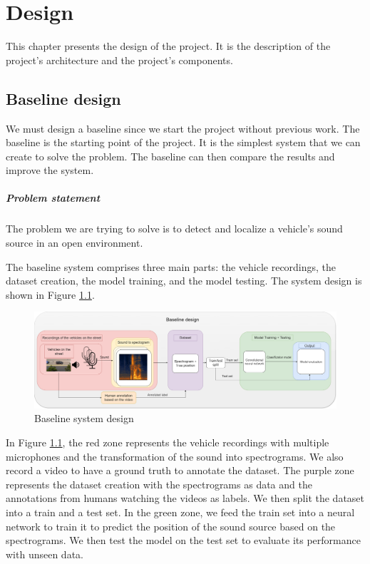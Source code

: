 
\chapter{Design}
\label{ch:methodology}

This chapter presents the design of the project. It is the description of the project's architecture and the project's components.

\section{Baseline design}
\label{sec:baseline_design}

We must design a baseline since we start the project without previous work. The baseline is the starting point of the project. It is the simplest system that we can create to solve the problem. The baseline can then compare the results and improve the system.

\paragraph{Problem statement}

The problem we are trying to solve is to detect and localize a vehicle's sound source in an open environment. 

The baseline system comprises three main parts: the vehicle recordings, the dataset creation, the model training, and the model testing. The system design is shown in Figure \ref{fig:baseline_system_design}.

\begin{figure}[H]
    \centering
    \includegraphics[width=1\textwidth]{../Images/baseline_system_design.drawio.png}
    \caption{Baseline system design}
    \label{fig:baseline_system_design}
\end{figure}

In Figure \ref{fig:baseline_system_design}, the red zone represents the vehicle recordings with multiple microphones and the transformation of the sound into spectrograms. We also record a video to have a ground truth to annotate the dataset. The purple zone represents the dataset creation with the spectrograms as data and the annotations from humans watching the videos as labels. We then split the dataset into a train and a test set. In the green zone, we feed the train set into a neural network to train it to predict the position of the sound source based on the spectrograms. We then test the model on the test set to evaluate its performance with unseen data.


